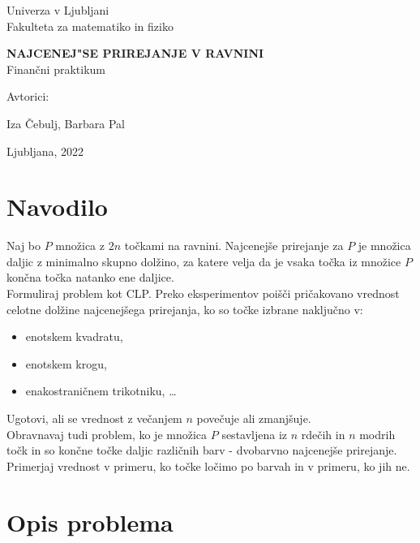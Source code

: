 \documentclass[a4paper, 11pt]{article}
\begin{document}
\thispagestyle{empty}
\begin{center}
\begin{minipage}{0.75\linewidth}
    \centering
    {\Large Univerza v Ljubljani \\ Fakulteta za matematiko in fiziko}
    \\
    \vspace{7cm}

    {\uppercase{\Large \textbf{Najcenej"se prirejanje v ravnini}}} \\ Finančni praktikum \\
    \vspace{3cm}

    Avtorici:\\
    {\Large Iza Čebulj, Barbara Pal\par}
    \vspace{7cm}

    {\Large Ljubljana, 2022}
\end{minipage}
\end{center}

\newpage
 
\section{Navodilo}

Naj bo $P$ množica z $2n$ točkami na ravnini. Najcenejše prirejanje za $P$ je množica daljic z minimalno skupno dolžino, za katere velja da je vsaka točka iz množice $P$ končna točka natanko ene daljice. \\
Formuliraj problem kot CLP. Preko eksperimentov poišči pričakovano vrednost celotne dolžine najcenejšega prirejanja, ko so točke izbrane naključno v:
\begin{itemize}
    \item enotskem kvadratu,
    \item enotskem krogu,
    \item enakostraničnem trikotniku, \dots
\end{itemize}
Ugotovi, ali se vrednost z večanjem $n$ povečuje ali zmanjšuje. \\
Obravnavaj tudi problem, ko je množica $P$ sestavljena iz $n$ rdečih in $n$ modrih točk in so končne točke daljic različnih barv - dvobarvno najcenejše prirejanje. 
Primerjaj vrednost v primeru, ko točke ločimo po barvah in v primeru, ko jih ne.  

\section{Opis problema}
\end{document}

